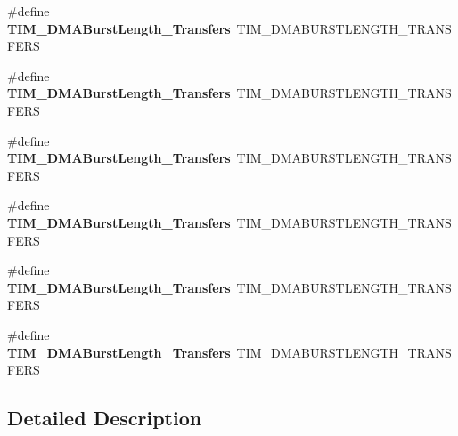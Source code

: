 \begin{DoxyCompactItemize}
\#define {\bfseries T\+I\+M\+\_\+\+D\+M\+A\+Burst\+Length\+\_\+Transfers}~T\+I\+M\+\_\+\+D\+M\+A\+B\+U\+R\+S\+T\+L\+E\+N\+G\+T\+H\+\_\+T\+R\+A\+N\+S\+F\+E\+RS
\item 
\mbox{\label{group___h_a_l___t_i_m___aliased___defines_gab1a097ca7404e518839df99795443fb0}} 
\#define {\bfseries T\+I\+M\+\_\+\+D\+M\+A\+Burst\+Length\+\_\+Transfers}~T\+I\+M\+\_\+\+D\+M\+A\+B\+U\+R\+S\+T\+L\+E\+N\+G\+T\+H\+\_\+T\+R\+A\+N\+S\+F\+E\+RS
\item 
\mbox{\label{group___h_a_l___t_i_m___aliased___defines_gad13373f5fd246557a4fc487dc43c37ec}} 
\#define {\bfseries T\+I\+M\+\_\+\+D\+M\+A\+Burst\+Length\+\_\+Transfers}~T\+I\+M\+\_\+\+D\+M\+A\+B\+U\+R\+S\+T\+L\+E\+N\+G\+T\+H\+\_\+T\+R\+A\+N\+S\+F\+E\+RS
\item 
\mbox{\label{group___h_a_l___t_i_m___aliased___defines_gafb644e6033f7b46c602b02754b69fde0}} 
\#define {\bfseries T\+I\+M\+\_\+\+D\+M\+A\+Burst\+Length\+\_\+Transfers}~T\+I\+M\+\_\+\+D\+M\+A\+B\+U\+R\+S\+T\+L\+E\+N\+G\+T\+H\+\_\+T\+R\+A\+N\+S\+F\+E\+RS
\item 
\mbox{\label{group___h_a_l___t_i_m___aliased___defines_ga5b2c97f650a3c1726965187d852b8cc5}} 
\#define {\bfseries T\+I\+M\+\_\+\+D\+M\+A\+Burst\+Length\+\_\+Transfers}~T\+I\+M\+\_\+\+D\+M\+A\+B\+U\+R\+S\+T\+L\+E\+N\+G\+T\+H\+\_\+T\+R\+A\+N\+S\+F\+E\+RS
\item 
\mbox{\label{group___h_a_l___t_i_m___aliased___defines_gaed9f2afef174079f6eb6927abd995b9b}} 
\#define {\bfseries T\+I\+M\+\_\+\+D\+M\+A\+Burst\+Length\+\_\+Transfers}~T\+I\+M\+\_\+\+D\+M\+A\+B\+U\+R\+S\+T\+L\+E\+N\+G\+T\+H\+\_\+T\+R\+A\+N\+S\+F\+E\+RS
\end{DoxyCompactItemize}


\subsection{Detailed Description}

